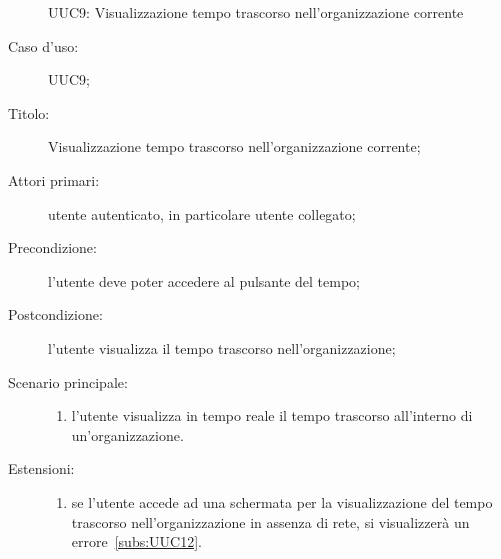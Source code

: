 \documentclass[../../../analisi-dei-requisiti.tex]{subfiles}
\begin{document}
\begin{figure}[H]
  \centering
  \caption{UUC9: Visualizzazione tempo trascorso nell'organizzazione corrente}%
  \label{fig:UUC9}
\end{figure}

\begin{description}
  \item[Caso d’uso:] UUC9;
  \item[Titolo:] Visualizzazione tempo trascorso nell'organizzazione corrente;
  \item[Attori primari:] utente autenticato, in particolare utente collegato;
  \item[Precondizione:] l'utente deve poter accedere al pulsante del tempo;
  \item[Postcondizione:] l'utente visualizza il tempo trascorso nell'organizzazione;
  \item[Scenario principale:]
        \begin{enumerate}
          \item l'utente visualizza in tempo reale il tempo trascorso all'interno di un'organizzazione.
        \end{enumerate}
  \item[Estensioni:]
        \begin{enumerate}
          \item se l'utente accede ad una schermata per la visualizzazione del tempo trascorso nell'organizzazione in assenza di rete, si visualizzerà un errore~\ref{subs:UUC12}.
        \end{enumerate}
\end{description}
\end{document}
